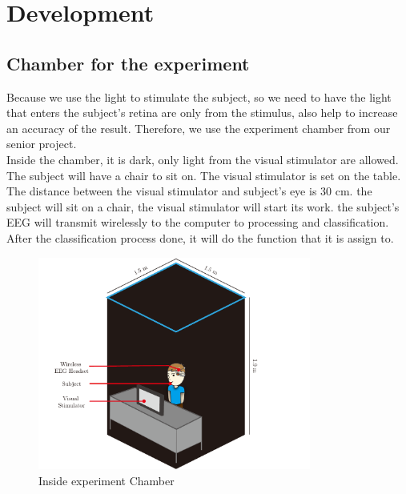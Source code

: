 \chapter{Development}

\label{ch:Development}

\setlength{\parindent}{4em}
\setlength{\parskip}{1em}
\renewcommand{\baselinestretch}{1.5}

\section{Chamber for the experiment}
\hspace{1.5cm}Because we use the light to stimulate the subject, so we need to have the light that enters the subject's retina are only from the stimulus, also help to increase an accuracy of the result. Therefore, we use the experiment chamber from our senior project.\cite{senior}\\
Inside the chamber, it is dark, only light from the visual stimulator are allowed. The subject will have a chair to sit on. The visual stimulator is set on the table. The distance between the visual stimulator and subject's eye is 30 cm. the subject will sit on a chair, the visual stimulator will start its work. the subject's EEG will transmit wirelessly to the computer to processing and classification. After the classification process done, it will do the function that it is assign to. \\
\begin{figure}[ht]
	\centering
	\includegraphics[width=0.8\textwidth]{chapter6/dark_wire_inside.pdf}
	\caption{Inside experiment Chamber}
\end{figure}

